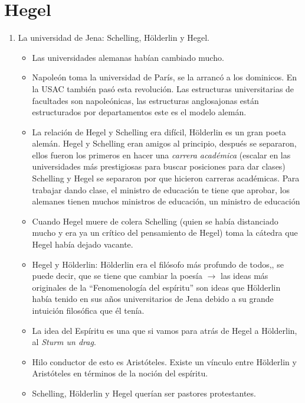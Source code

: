 \section{Hegel}
\begin{enumerate}
    \item La universidad de Jena: Schelling, Hölderlin y Hegel.
        \begin{itemize}
            \item Las universidades alemanas habían cambiado mucho. 
            \item Napoleón toma la universidad de París, se la arrancó a los dominicos. En la USAC también pasó esta revolución. Las estructuras universitarias de facultades son napoleónicas, las estructuras anglosajonas están estructurados por departamentos este es el modelo alemán.
            \item La relación de Hegel y Schelling era difícil, Hölderlin es un gran poeta alemán. Hegel y Schelling eran amigos al principio, después se separaron, ellos fueron los primeros en hacer una \emph{carrera académica} (escalar en las universidades más prestigiosas para buscar posiciones para dar clases) Schelling y Hegel se separaron por que hicieron carreras académicas. Para trabajar dando clase, el ministro de educación te tiene que aprobar, los alemanes tienen muchos ministros de educación, un ministro de educación 
            \item Cuando Hegel muere de colera Schelling (quien se había distanciado mucho y era ya un crítico del pensamiento de Hegel) toma la cátedra que Hegel había dejado vacante. 
            \item Hegel y Hölderlin: Hölderlin era el filósofo más profundo de todos,, se puede decir, que se tiene que cambiar la poesía $\rightarrow$ las ideas más originales de la ``Fenomenología del espíritu''  son ideas que Hölderlin había tenido en sus años universitarios de Jena debido a su grande intuición filosófica que él tenía. 
            \item La idea del Espíritu es una que si vamos para atrás de Hegel a Hölderlin, al \emph{Sturm un drag}. 
            \item Hilo conductor de esto es Aristóteles. Existe un vínculo entre Hölderlin y Aristóteles en términos de la noción del espíritu.
            \item Schelling, Hölderlin y Hegel querían ser pastores protestantes. 
        \end{itemize}
    

\end{enumerate}
